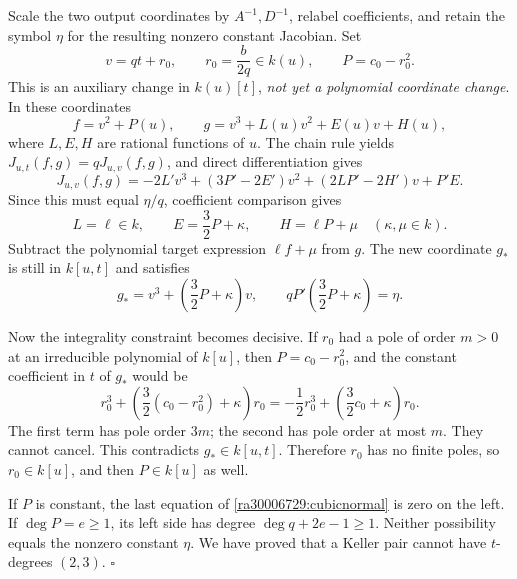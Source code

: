 \documentclass[11pt]{article}
\begin{document}
Scale the two output coordinates by $A^{-1},D^{-1}$, relabel coefficients,
and retain the symbol $\eta$ for the resulting nonzero constant Jacobian.
Set
\[
 v=qt+r_0,\qquad r_0=\frac{b}{2q}\in k(u),\qquad
 P=c_0-r_0^2.
\]
This is an auxiliary change in $k(u)[t]$, \emph{not yet a polynomial
coordinate change}. In these coordinates
\[
 f=v^2+P(u),\qquad
 g=v^3+L(u)v^2+E(u)v+H(u),
\]
where $L,E,H$ are rational functions of $u$. The chain rule yields
$J_{u,t}(f,g)=qJ_{u,v}(f,g)$, and direct differentiation gives
\begin{equation}\label{ra30006729:cubiccompare}
 J_{u,v}(f,g)=
 -2L'v^3+(3P'-2E')v^2+(2LP'-2H')v+P'E.
\end{equation}
Since this must equal $\eta/q$, coefficient comparison gives
\[
 L=\ell\in k,\qquad E=\frac32P+\kappa,\qquad
 H=\ell P+\mu\quad(\kappa,\mu\in k).
\]
Subtract the polynomial target expression $\ell f+\mu$ from $g$. The new
coordinate $g_*$ is still in $k[u,t]$ and satisfies
\begin{equation}\label{ra30006729:cubicnormal}
 g_*=v^3+\left(\frac32P+\kappa\right)v,
 \qquad qP'\left(\frac32P+\kappa\right)=\eta.
\end{equation}

Now the integrality constraint becomes decisive. If $r_0$ had a pole of
order $m>0$ at an irreducible polynomial of $k[u]$, then
$P=c_0-r_0^2$, and the constant coefficient in $t$ of $g_*$ would be
\begin{equation}\label{ra30006729:pole}
 r_0^3+\left(\frac32(c_0-r_0^2)+\kappa\right)r_0
 =-\frac12r_0^3+\left(\frac32c_0+\kappa\right)r_0.
\end{equation}
The first term has pole order $3m$; the second has pole order at most $m$.
They cannot cancel. This contradicts $g_*\in k[u,t]$. Therefore $r_0$ has
no finite poles, so $r_0\in k[u]$, and then $P\in k[u]$ as well.

If $P$ is constant, the last equation of \eqref{ra30006729:cubicnormal} is zero
on the left. If $\deg P=e\ge1$, its left side has degree
$\deg q+2e-1\ge1$. Neither possibility equals the nonzero constant $\eta$.
We have proved that a Keller pair cannot have $t$-degrees $(2,3)$.
\hfill$\square$
\end{document}
